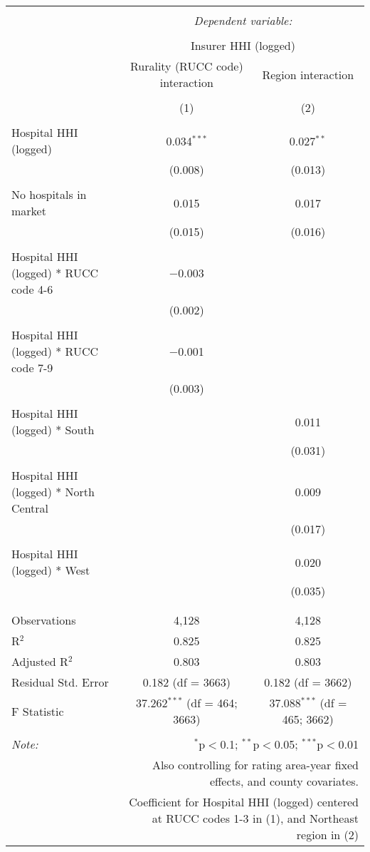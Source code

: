 
\begingroup 
\scriptsize 
\begin{tabular}{@{\extracolsep{5pt}}lcc} 
\\[-1.8ex]\hline 
\hline \\[-1.8ex] 
 & \multicolumn{2}{c}{\textit{Dependent variable:}} \\ 
\cline{2-3} 
\\[-1.8ex] & \multicolumn{2}{c}{Insurer HHI (logged)} \\ 
 & Rurality (RUCC code) interaction & Region interaction \\ 
\\[-1.8ex] & (1) & (2)\\ 
\hline \\[-1.8ex] 
 Hospital HHI (logged) & 0.034$^{***}$ & 0.027$^{**}$ \\ 
  & (0.008) & (0.013) \\ 
  & & \\ 
 No hospitals in market & 0.015 & 0.017 \\ 
  & (0.015) & (0.016) \\ 
  & & \\ 
 Hospital HHI (logged) * RUCC code 4-6 & $-$0.003 &  \\ 
  & (0.002) &  \\ 
  & & \\ 
 Hospital HHI (logged) * RUCC code 7-9 & $-$0.001 &  \\ 
  & (0.003) &  \\ 
  & & \\ 
 Hospital HHI (logged) * South &  & 0.011 \\ 
  &  & (0.031) \\ 
  & & \\ 
 Hospital HHI (logged) * North Central &  & 0.009 \\ 
  &  & (0.017) \\ 
  & & \\ 
 Hospital HHI (logged) * West &  & 0.020 \\ 
  &  & (0.035) \\ 
  & & \\ 
\hline \\[-1.8ex] 
Observations & 4,128 & 4,128 \\ 
R$^{2}$ & 0.825 & 0.825 \\ 
Adjusted R$^{2}$ & 0.803 & 0.803 \\ 
Residual Std. Error & 0.182 (df = 3663) & 0.182 (df = 3662) \\ 
F Statistic & 37.262$^{***}$ (df = 464; 3663) & 37.088$^{***}$ (df = 465; 3662) \\ 
\hline 
\hline \\[-1.8ex] 
\textit{Note:}  & \multicolumn{2}{r}{$^{*}$p$<$0.1; $^{**}$p$<$0.05; $^{***}$p$<$0.01} \\ 
 & \multicolumn{2}{r}{Also controlling for rating area-year fixed effects, and county covariates.} \\ 
 & \multicolumn{2}{r}{Coefficient for Hospital HHI (logged) centered at RUCC codes 1-3 in (1), and Northeast region in (2)} \\ 
\end{tabular} 
\endgroup 
